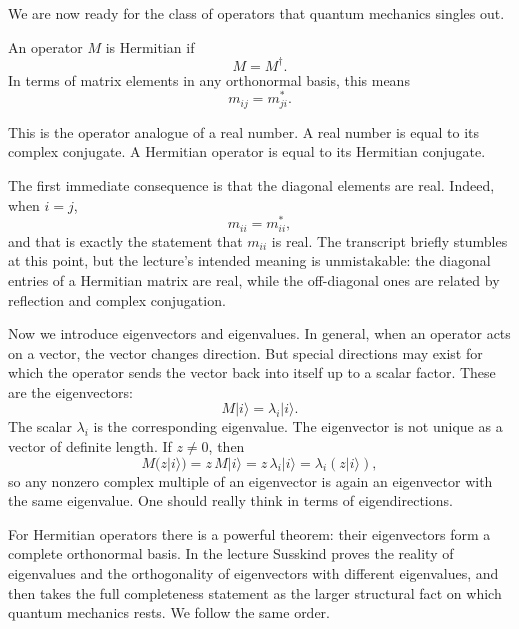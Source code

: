 We are now ready for the class of operators that quantum mechanics singles out.

\begin{definition}
An operator \(M\) is Hermitian if
\begin{equation}
M=M^\dagger.
\end{equation}
In terms of matrix elements in any orthonormal basis, this means
\begin{equation}
m_{ij}=m_{ji}^*.
\end{equation}
\end{definition}

This is the operator analogue of a real number. A real number is equal to its complex conjugate. A Hermitian operator is equal to its Hermitian conjugate.

The first immediate consequence is that the diagonal elements are real. Indeed, when \(i=j\),
\begin{equation}
m_{ii}=m_{ii}^*,
\end{equation}
and that is exactly the statement that \(m_{ii}\) is real. The transcript briefly stumbles at this point, but the lecture's intended meaning is unmistakable: the diagonal entries of a Hermitian matrix are real, while the off-diagonal ones are related by reflection and complex conjugation.

Now we introduce eigenvectors and eigenvalues. In general, when an operator acts on a vector, the vector changes direction. But special directions may exist for which the operator sends the vector back into itself up to a scalar factor. These are the eigenvectors:
\begin{equation}
M|i\rangle=\lambda_i |i\rangle.
\end{equation}
The scalar \(\lambda_i\) is the corresponding eigenvalue. The eigenvector is not unique as a vector of definite length. If \(z\neq 0\), then
\begin{equation}
M(z|i\rangle)=z\,M|i\rangle=z\,\lambda_i |i\rangle=\lambda_i(z|i\rangle),
\end{equation}
so any nonzero complex multiple of an eigenvector is again an eigenvector with the same eigenvalue. One should really think in terms of eigendirections.

For Hermitian operators there is a powerful theorem: their eigenvectors form a complete orthonormal basis. In the lecture Susskind proves the reality of eigenvalues and the orthogonality of eigenvectors with different eigenvalues, and then takes the full completeness statement as the larger structural fact on which quantum mechanics rests. We follow the same order.


